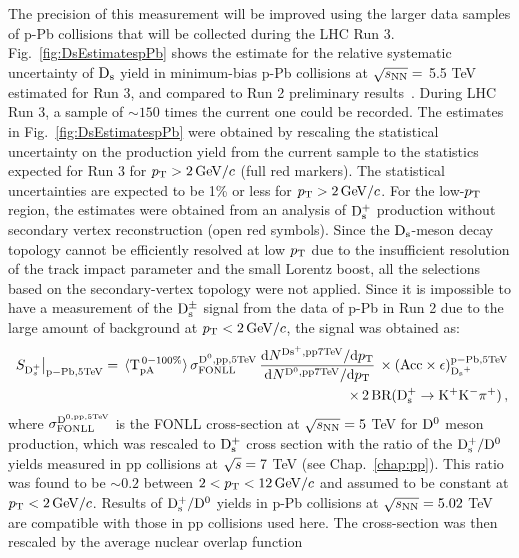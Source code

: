 The precision of this measurement will be improved using the 
larger data samples of p-Pb collisions that will be collected during the LHC Run 3.
Fig.~\ref{fig:DsEstimatespPb} shows the estimate for the relative systematic uncertainty of 
${\rm D_s}$ yield in minimum-bias p-Pb collisions at $\sqrt{s_{\rm NN}}=$ 5.5 TeV estimated for Run 3, and compared to Run 2 preliminary results~\cite{ALICE-PUBLIC-2017-008}. 
During LHC Run 3, a sample of $\sim 150$ times the current one could be recorded. 
The estimates in Fig.~\ref{fig:DsEstimatespPb} were obtained by rescaling the statistical 
uncertainty on the production yield from the current sample to the statistics expected for Run 3 for $p_{\rm T}>2\,\mathrm{GeV}/c$ (full red markers). 
The statistical uncertainties are expected to be 1\% or less for $p_{\rm T}>2\,\mathrm{GeV}/c$.
For the low-$p_{\rm T}$ region, the estimates were obtained from an analysis of ${\rm D_s^+}$ production without secondary vertex
reconstruction (open red symbols). Since the ${\rm D_s}$-meson decay topology cannot be efficiently resolved at low $p_{\rm T}$ due to the 
insufficient resolution of the track impact parameter and the small Lorentz boost, all the selections
based on the secondary-vertex topology were not applied.
Since it is impossible to have a measurement of the ${\rm D_s^{\pm}}$ signal from the data of p-Pb in Run 2 
due to the large amount of background at $p_{\rm T}<2\,\mathrm{GeV}/c$, the signal was obtained as:
\begin{equation}
\begin{split}
\label{eq:sigStime}\
S_{{\rm D}_{s}^+}\big|_{\rm p-Pb, 5 TeV} = \, \langle {\rm T}_{\rm pA}^{\rm \,0-100\%}\rangle\,\sigma_{\rm FONLL}^{\rm{ D}^{\rm 0},pp, 5 TeV} \,\frac{{\rm d}N^{\rm{ D}{\rm s}^+,pp 7 TeV}/{\rm d}p_{\rm T}}{{\rm d}N^{\rm{ D}^{\rm 0}, pp 7 TeV}/{\rm d}p_{\rm T}}\, \times ({\rm Acc\times \epsilon})_{{\rm D_s}^+}^{\rm p-Pb, 5 TeV}\\
\times \,2\,{\rm BR({\rm D^{+}_\mathrm{s}\to K^+ K^-\pi^+})}\, ,
\end{split}
\end{equation}
where $\sigma_{\rm FONLL}^{{\rm D}^{\rm 0,pp, 5 TeV}}$ is the FONLL cross-section at $\sqrt{s_{\rm NN}}=5$ TeV for ${\rm D^0}$ meson
production, which was rescaled to ${\rm D_s^+}$ cross section with the ratio of the ${\rm D_s^+}/{\rm D^0}$ yields measured 
in pp collisions at $\sqrt{s}=7$ TeV (see Chap.~\ref{chap:pp}). This ratio was found to be $\sim 0.2$ between $2 <p_{\rm T} <12 \, \mathrm{GeV}/c$
and assumed to be constant at $p_{\rm T}<2\,\mathrm{GeV}/c$. Results of ${\rm D_s^+}/{\rm D^0}$ yields in p-Pb collisions at $\sqrt{s_{\rm NN}}=5.02$ TeV~\cite{ALICE-PUBLIC-2017-008}
are compatible with those in pp collisions used here.
The cross-section was then rescaled by the average nuclear overlap function 
